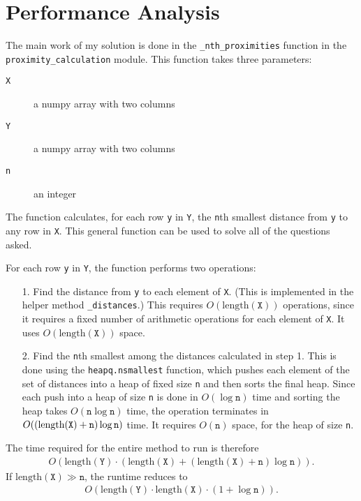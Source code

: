 \documentclass{amsart}
\theoremstyle{definition}
\theoremstyle{definition}
\begin{document}
\section{Performance Analysis}
The main work of my solution is done in the \texttt{\_nth\_proximities} function in the \texttt{proximity\_calculation} module.  This function takes three parameters:
\begin{description}
\item[\texttt{X}] a numpy array with two columns
\item[\texttt{Y}] a numpy array with two columns
\item[\texttt{n}] an integer
\end{description}
The function calculates, for each row \texttt{y} in \texttt{Y}, the \texttt{n}th smallest distance from \texttt{y} to any row in \texttt{X}.  This general function can be used to solve all of the questions asked.

For each row \texttt{y} in \texttt{Y}, the function performs two operations:
\begin{itemize}
\item[1.] Find the distance from \texttt{y} to each element of \texttt{X}.  (This is implemented in the helper method \texttt{\_distances}.)  This requires $O(\mbox{length}(\texttt{X}))$ operations, since it requires a fixed number of arithmetic operations for each element of \texttt{X}.  It uses $O(\mbox{length}(\texttt{X}))$ space.
\item[2.] Find the \texttt{n}th smallest among the distances calculated in step 1.  This is done using the \texttt{heapq.nsmallest} function, which pushes each element of the set of distances into a heap of fixed size \texttt{n} and then sorts the final heap.  Since each push into a heap of size \texttt{n} is done in $O(\log \texttt{n})$ time and sorting the heap takes $O(\texttt{n}\log \texttt{n})$ time, the operation terminates in $O((\mbox{length(\texttt{X})}+\texttt{n})\log \texttt{n})$ time.  It requires $O(\texttt{n})$ space, for the heap of size \texttt{n}.
\end{itemize}
The time required for the entire method to run is therefore
\begin{align*}
  O(\mbox{length}(\texttt{Y})\cdot (\mbox{length}(\texttt{X}) + (\mbox{length}(\texttt{X})+\texttt{n})\log \texttt{n})).
\end{align*}
If $\mbox{length}(\texttt{X}) \gg \texttt{n}$, the runtime reduces to
\begin{align}
  O(\mbox{length}(\texttt{Y})\cdot \mbox{length}(\texttt{X}) \cdot (1+\log \texttt{n}))\label{performance}.
\end{align}
\end{document}
